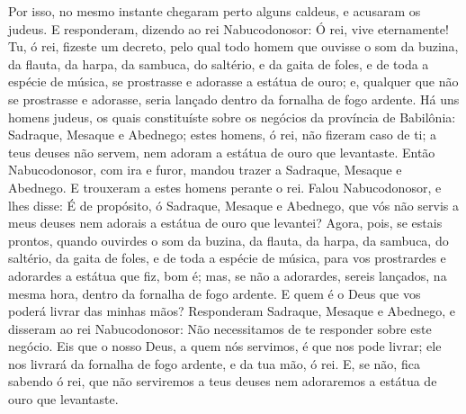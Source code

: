 Por isso, no mesmo instante chegaram perto alguns caldeus, e
acusaram os judeus. E responderam, dizendo ao rei Nabucodonosor:
Ó rei, vive eternamente! Tu, ó rei, fizeste um decreto, pelo
qual todo homem que ouvisse o som da buzina, da flauta, da harpa, da
sambuca, do saltério, e da gaita de foles, e de toda a espécie de
música, se prostrasse e adorasse a estátua de ouro; e,
qualquer que não se prostrasse e adorasse, seria lançado dentro da
fornalha de fogo ardente. Há uns homens judeus, os quais
constituíste sobre os negócios da província de Babilônia: Sadraque,
Mesaque e Abednego; estes homens, ó rei, não fizeram caso de ti; a
teus deuses não servem, nem adoram a estátua de ouro que levantaste.
Então Nabucodonosor, com ira e furor, mandou trazer a
Sadraque, Mesaque e Abednego. E trouxeram a estes homens perante o
rei. Falou Nabucodonosor, e lhes disse: É de propósito, ó
Sadraque, Mesaque e Abednego, que vós não servis a meus deuses nem
adorais a estátua de ouro que levantei? Agora, pois, se
estais prontos, quando ouvirdes o som da buzina, da flauta, da
harpa, da sambuca, do saltério, da gaita de foles, e de toda a
espécie de música, para vos prostrardes e adorardes a estátua que
fiz, bom é; mas, se não a adorardes, sereis lançados, na mesma hora,
dentro da fornalha de fogo ardente. E quem é o Deus que vos poderá
livrar das minhas mãos? Responderam Sadraque, Mesaque e
Abednego, e disseram ao rei Nabucodonosor: Não necessitamos de te
responder sobre este negócio. Eis que o nosso Deus, a quem
nós servimos, é que nos pode livrar; ele nos livrará da fornalha de
fogo ardente, e da tua mão, ó rei. E, se não, fica sabendo ó
rei, que não serviremos a teus deuses nem adoraremos a estátua de
ouro que levantaste.

